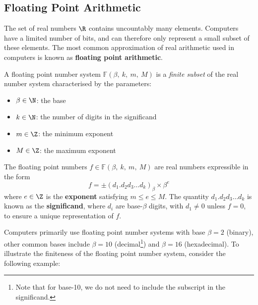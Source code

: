 \documentclass{article}
\begin{document}
\subsection{Floating Point Arithmetic}
The set of real numbers \(\R\) contains uncountably many elements.
Computers have a limited number of bits, and can therefore only
represent a small subset of these elements. The most common
approximation of real arithmetic used in computers is known as
\textbf{floating point arithmetic}.
\begin{definition}
    A floating point number system \(\mathbb{F}\left( \beta,\: k,\: m,\: M \right)\)
    is a \textit{finite subset} of the real number system characterised by the parameters:
    \begin{itemize}
        \item \(\beta \in \N\): the base
        \item \(k \in \N\): the number of digits in the significand
        \item \(m \in \Z\): the minimum exponent
        \item \(M \in \Z\): the maximum exponent
    \end{itemize}
\end{definition}
\begin{definition}
    The floating point numbers \(f \in \mathbb{F}\left( \beta,\: k,\: m,\: M \right)\)
    are real numbers expressible in the form
    \begin{equation*}
        f = \pm \left( d_1.d_2 d_3 \dots d_k \right)_\beta \times \beta^e
    \end{equation*}
    where \(e \in \Z\) is the \textbf{exponent} satisfying \(m \leq e \leq M\).
    The quantity \(d_1.d_2 d_3 \dots d_k\) is known as the \textbf{significand},
    where \(d_i\) are base-\(\beta\) digits, with \(d_1 \neq 0\) unless \(f = 0\),
    to ensure a unique representation of \(f\).
\end{definition}
Computers primarily use floating point number systems with base
\(\beta = 2\) (binary), other common bases include \(\beta = 10\)
(decimal\footnote{Note that for base-10, we do not need to include the
    subscript in the significand.}) and \(\beta = 16\) (hexadecimal). To
illustrate the finiteness of the floating point number system, consider
the following example:
\end{document}
